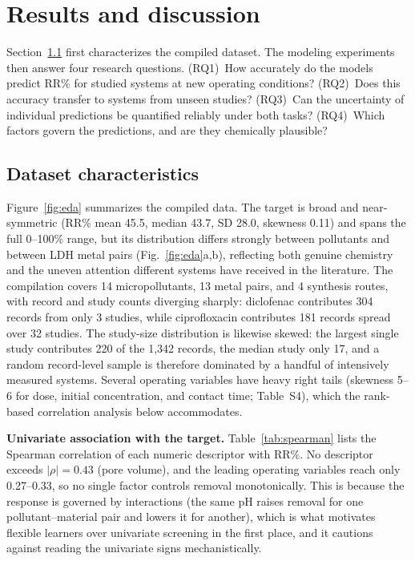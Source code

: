 \section{Results and discussion}
\label{sec:results}

Section~\ref{sec:eda} first characterizes the compiled dataset. The
modeling experiments then answer four research questions. (RQ1)~How
accurately do the models predict RR\% for studied systems at new
operating conditions? (RQ2)~Does this accuracy transfer to systems from
unseen studies? (RQ3)~Can the uncertainty of individual predictions be
quantified reliably under both tasks? (RQ4)~Which factors govern the
predictions, and are they chemically plausible?

\subsection{Dataset characteristics}
\label{sec:eda}

Figure~\ref{fig:eda} summarizes the compiled data. The target is broad
and near-symmetric (RR\% mean 45.5, median 43.7, SD 28.0, skewness 0.11)
and spans the full 0--100\% range, but its distribution differs strongly
between pollutants and between LDH metal pairs (Fig.~\ref{fig:eda}a,b),
reflecting both genuine chemistry and the uneven attention different
systems have received in the literature. The compilation covers 14
micropollutants, 13 metal pairs, and 4 synthesis routes, with record and
study counts diverging sharply: diclofenac contributes 304 records from
only 3 studies, while ciprofloxacin contributes 181 records spread over
32 studies. The study-size distribution is likewise skewed: the largest
single study contributes 220 of the 1,342 records, the median study only
17, and a random record-level sample is therefore dominated by a handful
of intensively measured systems. Several operating variables have heavy
right tails (skewness 5--6 for dose, initial concentration, and contact
time; Table~S4), which the rank-based correlation analysis below
accommodates.

\textbf{Univariate association with the target.} Table~\ref{tab:spearman}
lists the Spearman correlation of each numeric descriptor with RR\%. No
descriptor exceeds $|\rho| = 0.43$ (pore volume), and the leading
operating variables reach only 0.27--0.33, so no single factor controls
removal monotonically. This is because the response is governed by
interactions (the same pH raises removal for one pollutant--material
pair and lowers it for another), which is what motivates flexible
learners over univariate screening in the first place, and it cautions
against reading the univariate signs mechanistically.

